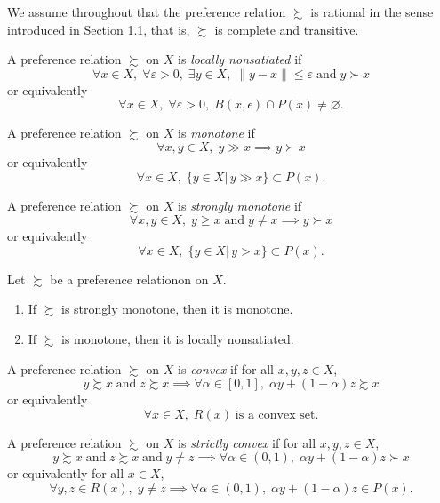 \documentclass[11pt,fleqn]{book} %
\begin{document}
We assume throughout that the preference relation $\succsim$ is rational in the sense introduced in Section 1.1, that is, $\succsim$ is complete and transitive.

\begin{definition}
	A preference relation $\succsim$ on $X$ is \emph{locally nonsatiated} if
	\[
	\forall x\in X,\;\forall \varepsilon>0,\;\exists y\in X,\;\|y-x\|\le\varepsilon\;\text{and}\;y\succ x
	\]
	or equivalently
	\[
	\forall x\in X,\;\forall \varepsilon>0,\;B(x,\epsilon)\cap P(x)\ne\varnothing.
	\]
\end{definition}

\begin{definition}[Monotonicity]
	A preference relation $\succsim$ on $X$ is \emph{monotone} if
	\[
	\forall x,y\in X,\;y\gg x\implies y\succ x
	\]
	or equivalently
	\[
	\forall x\in X,\;\{y\in X|\,y\gg x\}\subset P(x).
	\]
\end{definition}

\begin{definition}
	A preference relation $\succsim$ on $X$ is \emph{strongly monotone} if
	\[
	\forall x,y\in X,\;y\geqslant x\;\text{and}\;y\ne x\implies y\succ x
	\]
	or equivalently
	\[
	\forall x\in X,\;\{y\in X|\,y> x\}\subset P(x).
	\]
\end{definition}

\begin{proposition}
	Let $\succsim$ be a preference relationon on $X$.
	\begin{enumerate}	
		\item If $\succsim$ is strongly monotone, then it is monotone.	
		\item If $\succsim$ is monotone, then it is locally nonsatiated.		 
	\end{enumerate}
\end{proposition}

\begin{definition}[Convexity]
	A preference relation $\succsim$ on $X$ is \emph{convex} if for all $x,y,z\in X$,
	\[
    y\succsim x\;\text{and}\;z\succsim x\implies \forall\alpha\in[0,1],\;\alpha y+(1-\alpha)z\succsim x
    \]
	or equivalently
	\[
	\forall x\in X,\;R(x)\;\text{is a convex set}.
	\]
\end{definition}

\begin{definition}
	A preference relation $\succsim$ on $X$ is \emph{strictly convex} if for all $x,y,z\in X$,
	\[
	y\succsim x\;\text{and}\;z\succsim x\;\text{and}\;y\ne z\implies \forall\alpha\in(0,1),\;\alpha y+(1-\alpha)z\succ x
	\]
	or equivalently for all $x\in X$,
	\[
	\forall y,z\in R(x),\;y\ne z\implies\forall\alpha\in(0,1),\;\alpha y+(1-\alpha)z\in P(x).
	\]
\end{definition}
\end{document}
